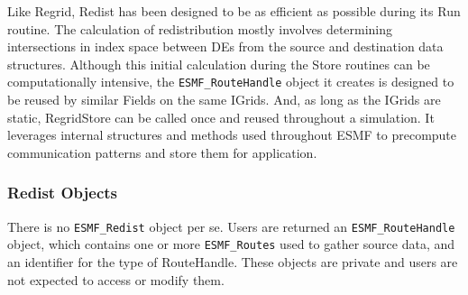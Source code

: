


Like Regrid, Redist has been designed to be as efficient as possible during its
Run routine.  The calculation of redistribution mostly involves determining
intersections in index space between DEs from the source and destination data
structures.  Although this initial calculation during the Store routines
can be computationally intensive, the {\tt ESMF\_RouteHandle} object
it creates is designed to be reused by similar Fields on the same IGrids.
And, as long as the IGrids are static, RegridStore can be called once
and reused throughout a simulation.  It leverages internal structures
and methods used throughout ESMF to precompute communication patterns and
store them for application.

\subsubsection{Redist Objects}

There is no {\tt ESMF\_Redist} object per se.  Users are returned an
{\tt ESMF\_RouteHandle} object, which contains one or more {\tt ESMF\_Routes}
used to gather source data, and an identifier for the type of RouteHandle.  These
objects are private and users are not expected to access or modify them.
